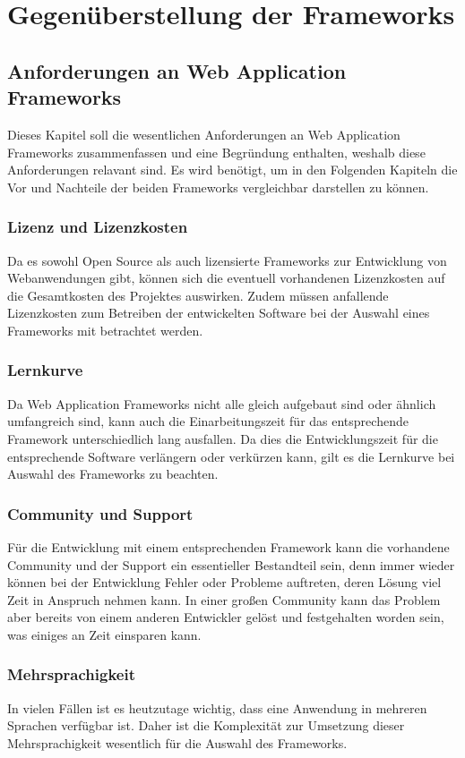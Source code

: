 \section{Gegenüberstellung der Frameworks}
\subsection{Anforderungen an Web Application Frameworks}
Dieses Kapitel soll die wesentlichen Anforderungen an Web Application Frameworks zusammenfassen und eine Begründung enthalten, weshalb diese Anforderungen relavant sind. Es wird benötigt, um in den Folgenden Kapiteln die Vor und Nachteile der beiden Frameworks vergleichbar darstellen zu können.
\subsubsection*{Lizenz und Lizenzkosten}
Da es sowohl Open Source als auch lizensierte Frameworks zur Entwicklung von Webanwendungen gibt, können sich die eventuell vorhandenen Lizenzkosten auf die Gesamtkosten des Projektes auswirken. Zudem müssen anfallende Lizenzkosten zum Betreiben der entwickelten Software bei der Auswahl eines Frameworks mit betrachtet werden.
\subsubsection*{Lernkurve}
Da Web Application Frameworks nicht alle gleich aufgebaut sind oder ähnlich umfangreich sind, kann auch die Einarbeitungszeit für das entsprechende Framework unterschiedlich lang ausfallen. Da dies die Entwicklungszeit für die entsprechende Software verlängern oder verkürzen kann, gilt es die Lernkurve bei Auswahl des Frameworks zu beachten.
\subsubsection*{Community und Support}
Für die Entwicklung mit einem entsprechenden Framework kann die vorhandene Community und der Support ein essentieller Bestandteil sein, denn immer wieder können bei der Entwicklung Fehler oder Probleme auftreten, deren Lösung viel Zeit in Anspruch nehmen kann. In einer großen Community kann das Problem aber bereits von einem anderen Entwickler gelöst und festgehalten worden sein, was einiges an Zeit einsparen kann.
\subsubsection*{Mehrsprachigkeit}
In vielen Fällen ist es heutzutage wichtig, dass eine Anwendung in mehreren Sprachen verfügbar ist. Daher ist die Komplexität zur Umsetzung dieser Mehrsprachigkeit wesentlich für die Auswahl des Frameworks.
